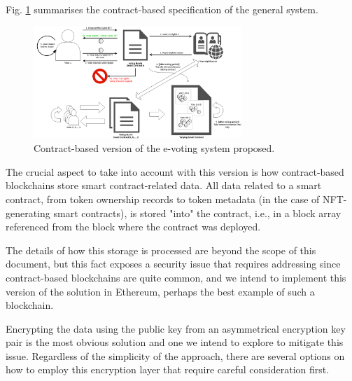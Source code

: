 \documentclass[./4_GeneralApproach.tex]{subfiles}
\begin{document}
Fig. \ref{fig:contract_based_architecture} summarises the contract-based specification of the general system.

\begin{figure}[htp]
    \centering
    \includegraphics[width=0.7\textwidth]{../Images/02_contract_based_solution.png}
    \caption{Contract-based version of the e-voting system proposed.}
    \label{fig:contract_based_architecture}
\end{figure}

The crucial aspect to take into account with this version is how contract-based blockchains store smart contract-related data. All data related to a smart contract, from token ownership records to token metadata (in the case of NFT-generating smart contracts), is stored "into" the contract, i.e., in a block array referenced from the block where the contract was deployed.



The details of how this storage is processed are beyond the scope of this document, but this fact exposes a security issue that requires addressing since contract-based blockchains are quite common, and we intend to implement this version of the solution in Ethereum, perhaps the best example of such a blockchain.
\par
Encrypting the data using the public key from an asymmetrical encryption key pair is the most obvious solution and one we intend to explore to mitigate this issue. Regardless of the simplicity of the approach, there are several options on how to employ this encryption layer that require careful consideration first.
\end{document}
